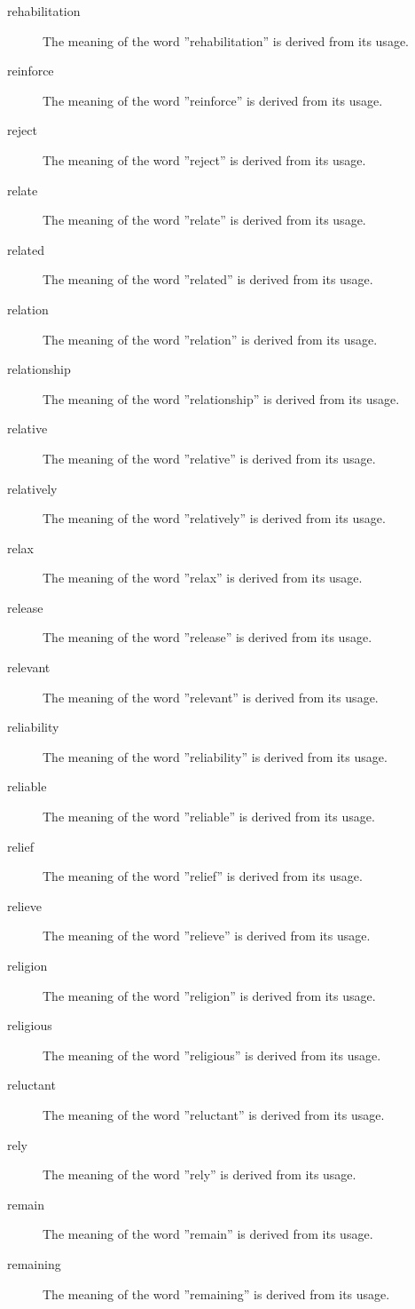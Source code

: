 \documentclass[12pt, letterpaper]{memoir}
\begin{document}
\begin{description}
\item[rehabilitation] The meaning of the word ''rehabilitation'' is derived from its usage.
\item[reinforce] The meaning of the word ''reinforce'' is derived from its usage.
\item[reject] The meaning of the word ''reject'' is derived from its usage.
\item[relate] The meaning of the word ''relate'' is derived from its usage.
\item[related] The meaning of the word ''related'' is derived from its usage.
\item[relation] The meaning of the word ''relation'' is derived from its usage.
\item[relationship] The meaning of the word ''relationship'' is derived from its usage.
\item[relative] The meaning of the word ''relative'' is derived from its usage.
\item[relatively] The meaning of the word ''relatively'' is derived from its usage.
\item[relax] The meaning of the word ''relax'' is derived from its usage.
\item[release] The meaning of the word ''release'' is derived from its usage.
\item[relevant] The meaning of the word ''relevant'' is derived from its usage.
\item[reliability] The meaning of the word ''reliability'' is derived from its usage.
\item[reliable] The meaning of the word ''reliable'' is derived from its usage.
\item[relief] The meaning of the word ''relief'' is derived from its usage.
\item[relieve] The meaning of the word ''relieve'' is derived from its usage.
\item[religion] The meaning of the word ''religion'' is derived from its usage.
\item[religious] The meaning of the word ''religious'' is derived from its usage.
\item[reluctant] The meaning of the word ''reluctant'' is derived from its usage.
\item[rely] The meaning of the word ''rely'' is derived from its usage.
\item[remain] The meaning of the word ''remain'' is derived from its usage.
\item[remaining] The meaning of the word ''remaining'' is derived from its usage.

\end{description}
\end{document}
